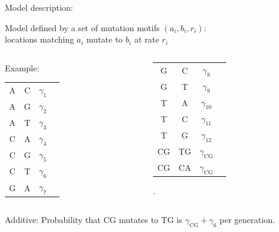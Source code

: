 \documentclass[smaller]{beamer}
\newcommand{\nA}{\mbox{A}}
\newcommand{\nC}{\mbox{C}}
\newcommand{\nG}{\mbox{G}}
\newcommand{\nT}{\mbox{T}}
\begin{document}
\begin{frame}{Model description:}


        {\struct Model} defined by a set of 
        mutation motifs {\newthing $(a_i,b_i,r_i)$: 
        }\\
      \quad locations matching $a_i$ mutate to $b_i$ at rate $r_i$ \\

      \vspace{1em}

  \begin{columns}[c]
    \begin{column}{.5\textwidth}
      {\struct Example:}
  \begin{center}
    \begin{tabular}{c@{\quad$\to$\quad}c@{\quad at rate\quad }cc}
        \nA      &  \nC      &  $\gamma_1$ & \\
        \nA      &  \nG      &  $\gamma_2$ & \\
        \nA      &  \nT      &  $\gamma_3$ & \\
        \nC      &  \nA      &  $\gamma_4$ & \\
        \nC      &  \nG      &  $\gamma_5$ & \\
        \nC      &  \nT      &  $\gamma_6$ & \\
        \nG      &  \nA      &  $\gamma_7$ & 
    \end{tabular} 
  \end{center}
  \end{column}
  \begin{column}{.5\textwidth}
  \begin{center}
    \begin{tabular}{c@{\quad$\to$\quad}c@{\quad at rate\quad }cc}
        \nG      &  \nC      &  $\gamma_8$ & \\
        \nG      &  \nT      &  $\gamma_9$ & \\
        \nT      &  \nA      &  $\gamma_{10}$ & \\
        \nT      &  \nC      &  $\gamma_{11}$ & \\
        \nT      &  \nG      &  $\gamma_{12}$ & \\
        \nC\nG   &  \nT\nG   &  $\gamma_{\nC\nG}$ & \\
        \nC\nG   &  \nC\nA   &  $\gamma_{\nC\nG}$ &
    \end{tabular} .
  \end{center}
  \end{column}
  \end{columns}

  \vspace{1em}

  {\struct Additive:} Probability that CG mutates to TG is $\gamma_{\nC\nG} + \gamma_6$ per generation.

\end{frame}
\end{document}
